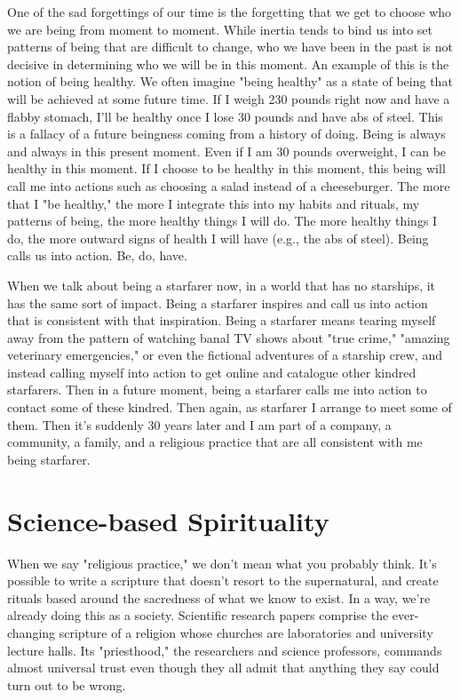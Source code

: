 \documentclass[ebook,11pt,openany,twoside,showtrims]{memoir}
\begin{document}
One of the sad forgettings of our time is the forgetting that we get to choose
who we are being from moment to moment. While inertia tends to bind us into set
patterns of being that are difficult to change, who we have been in the past is
not decisive in determining who we will be in this moment. An example of this
is the notion of being healthy. We often imagine "being healthy" as a state of
being that will be achieved at some future time. If I weigh 230 pounds right
now and have a flabby stomach, I'll be healthy once I lose 30 pounds and have
abs of steel. This is a fallacy of a future beingness coming from a history of
doing. Being is always and always in this present moment. Even if I am 30
pounds overweight, I can be healthy in this moment. If I choose to be healthy
in this moment, this being will call me into actions such as choosing a salad
instead of a cheeseburger. The more that I "be healthy," the more I integrate
this into my habits and rituals, my patterns of being, the more healthy things
I will do. The more healthy things I do, the more outward signs of health I
will have (e.g., the abs of steel). Being calls us into action. Be, do, have.

When we talk about being a starfarer now, in a world that has no starships, it
has the same sort of impact. Being a starfarer inspires and call us into action
that is consistent with that inspiration. Being a starfarer means tearing
myself away from the pattern of watching banal TV shows about "true crime,"
"amazing veterinary emergencies," or even the fictional adventures of a
starship crew, and instead calling myself into action to get online and
catalogue other kindred starfarers. Then in a future moment, being a starfarer
calls me into action to contact some of these kindred. Then again, as starfarer
I arrange to meet some of them. Then it's suddenly 30 years later and I am part
of a company, a community, a family, and a religious practice that are all
consistent with me being starfarer.

\chapter{Science-based Spirituality}

When we say "religious practice," we don't mean what you probably think. It's
possible to write a scripture that doesn't resort to the supernatural, and
create rituals based around the sacredness of what we know to exist. In a way,
we're already doing this as a society. Scientific research papers comprise the
ever-changing scripture of a religion whose churches are laboratories and
university lecture halls. Its "priesthood," the researchers and science
professors, commands almost universal trust even though they all admit that
anything they say could turn out to be wrong.
\end{document}
